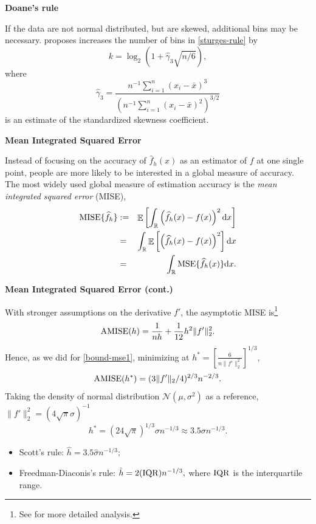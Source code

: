 \documentclass[19pt,landscaoe]{article}
\DeclareMathOperator{\E}{\mathbb{E}}
\newcommand{\R}{\mathbb{R}}
\begin{document}
\newpage
{\LARGE{\textbf{Doane's rule}}}
\vskip15pt
\begin{minipage}{.9\textwidth}
    \Large 
If the data are not normal distributed, but are skewed, additional bins may be necessary. \cite{doane76} proposes increases the number of bins in \eqref{sturges-rule} by 
\begin{equation}\label{doane-rule}    k=\log_2(1+\hat{\gamma}_3\sqrt{n/6}),
\end{equation}
where 
$$\hat{\gamma}_3=\frac{n^{-1}\sum_{i=1}^n(x_i-\bar{x})^3}{(n^{-1}\sum_{i=1}^n(x_i-\bar{x})^2)^{3/2}}$$
is an estimate of the standardized skewness coefficient. 
\end{minipage}

\newpage
{\LARGE{\textbf{Mean Integrated Squared Error}}}
\vskip15pt
\begin{minipage}{.9\textwidth}
    \Large 
Instead of focusing on the accuracy of $\widehat{f}_h(x)$ as an estimator of $f$ at one single point, people are more likely to be interested in a global measure of accuracy. The most widely used global measure of estimation accuracy is the {\it mean integrated squared error} (MISE), 
\begin{eqnarray}
    {\rm MISE}\{\widehat{f}_h\}&:=&\E\left[\int_{\R}\left(\widehat{f}_h(x)-f(x)\right)^2\mathrm{d}x\right]\\
&=&\int_{\R}\E\left[\left(\widehat{f}_h(x)-f(x)\right)^2\right]\mathrm{d}x\nonumber\\
&=&\int_{\R}{\rm MSE}\{\widehat{f}_h(x)\}\mathrm{d}x.
\end{eqnarray}

\end{minipage}

\newpage
{\LARGE{\textbf{Mean Integrated Squared Error (cont.)}}}
\vskip15pt
\begin{minipage}{.9\textwidth}
    \Large 
    With stronger assumptions on the derivative $f'$, the asymptotic MISE is\footnote{See \cite[Section~3.2]{scott15} for more detailed analysis.}
    $${\rm AMISE}(h)=\frac1{nh}+\frac1{12}h^2\|f'\|_2^2.$$
    Hence, as we did for \eqref{bound-mse1}, minimizing at $h^*=\left[\frac6{n\|f'\|_2^2}\right]^{1/3}$, 
    \begin{equation}
    {\rm AMISE}(h^*)=(3\|f'\|_2/4)^{2/3}n^{-2/3}.
    \end{equation}
    Taking the density of normal distribution $\mathcal{N}(\mu,\sigma^2)$ as a reference, $\|f'\|_2^2=(4\sqrt{\pi}\sigma)^{-1}$
    \begin{equation}
        h^*=(24\sqrt{\pi})^{1/3}\sigma n^{-1/3}\approx 3.5\sigma n^{-1/3}.
        \end{equation}
        \begin{itemize}
            \item Scott's rule: $\hat{h}=3.5\hat{\sigma}n^{-1/3}$;
            \item Freedman-Diaconis's rule: $\hat{h}=2({\rm IQR})n^{-1/3},$ where ${\rm IQR}$ is the interquartile range. 
        \end{itemize}
\end{minipage}
\end{document}
